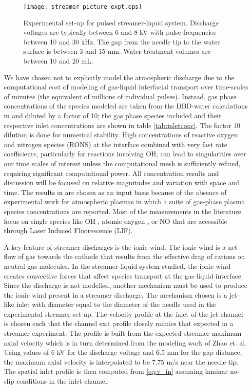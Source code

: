 \documentclass[12pt]{article}
\begin{document}
\begin{figure}[htpb]
    \centering
        \texttt{[image: streamer\_picture\_expt.eps]}
    \caption{Experimental set-up for pulsed streamer-liquid system. Discharge voltages are typically between 6 and 8 kV with pulse frequencies between 10 and 30 kHz. The gap from the needle tip to the water surface is between 3 and 15 mm. Water treatment volumes are between 10 and 20 mL.}
    \label{fig:streamer_picture}
\end{figure}

We have chosen not to explicitly model the atmospheric discharge due to the computational cost of modeling of gas-liquid interfacial transport over time-scales of minutes (the equivalent of millions of individual pulses). Instead, gas phase concentrations of the species modeled are taken from the DBD-water calculations in \cite{Tian2014} and diluted by a factor of 10; the gas phase species included and their respective inlet concentrations are shown in table \ref{tab:inletconc}. The factor 10 dilution is done for numerical stability.  High concentrations of reactive oxygen and nitrogen species (RONS) at the interface combined with very fast rate coefficients, particularly for reactions involving OH, can lead to singularities over our time scales of interest unless the computational mesh is sufficiently refined, requiring significant computational power. All concentration results and discussion will be focused on relative magnitudes and variation with space and time. The results in \cite{Tian2014} are chosen as an input basis because of the absence of experimental work for atmospheric plasmas in which a suite of gas-phase plasma species concentrations are reported. Most of the measurements in the literature focus on single species like OH \cite{ono1998measurement,ono2001oh,nakagawa2011density,verreycken2012time}, atomic oxygen \cite{niemi2005absolute}, or NO \cite{kanazawa2003two} that are accessible through Laser Induced Fluorescence (LIF).

A key feature of streamer discharges is the ionic wind. The ionic wind is a net flow of gas towards the cathode that results from the effective drag of cations on neutral gas molecules. In the streamer-liquid system studied, the ionic wind creates convective forces that affect species transport at the gas-liquid interface. Since the discharge is not modelled, another mechanism must be used to produce the ionic wind present in a streamer discharge. The mechanism chosen is a jet-like inlet with diameter equal to the diameter of the needle used in the experimental streamer set-up. The velocity profile at the inlet of the jet channel is chosen such that the channel exit profile closely mimics that expected in a streamer experiment. The profile is built from the expected streamer maximum axial velocity which is in turn determined from the modeling work of Zhao et. al. \cite{Zhao2005a} Using values of 6 kV for the discharge voltage and 6.5 mm for the gap distance, the maximum axial velocity is interpolated to be 7.75 m/s near the needle tip. The spatial inlet profile is then computed from \cref{eq:v_in} assuming laminar no-slip conditions in the inlet channel: \cite{bird2007transport}
\end{document}
